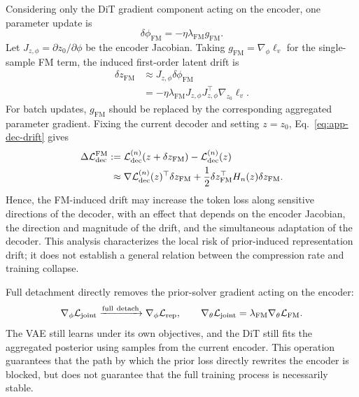 Considering only the DiT gradient component acting on the encoder, one parameter update is
\begin{equation}
    \delta\phi_{\mathrm{FM}}
    =-\eta\lambda_{\mathrm{FM}}g_{\mathrm{FM}}.
    \label{eq:app-fm-phi-drift}
\end{equation}
Let $J_{z,\phi}=\partial z_0/\partial\phi$ be the encoder Jacobian. Taking $g_{\mathrm{FM}}=\nabla_\phi\ell_v$ for the single-sample FM term, the induced first-order latent drift is
\begin{equation}
\begin{aligned}
    \delta z_{\mathrm{FM}}
    &\approx J_{z,\phi}\delta\phi_{\mathrm{FM}}\\
    &=-\eta\lambda_{\mathrm{FM}}
      J_{z,\phi}J_{z,\phi}^{\top}\nabla_{z_0}\ell_v.
\end{aligned}
\label{eq:app-fm-latent-drift}
\end{equation}
For batch updates, $g_{\mathrm{FM}}$ should be replaced by the corresponding aggregated parameter gradient. Fixing the current decoder and setting $z=z_0$, Eq.~\eqref{eq:app-dec-drift} gives
\begin{equation}
\begin{aligned}
    \Delta\mathcal{L}_{\mathrm{dec}}^{\mathrm{FM}}
    :={}&\mathcal{L}_{\mathrm{dec}}^{(n)}(z+\delta z_{\mathrm{FM}})
          -\mathcal{L}_{\mathrm{dec}}^{(n)}(z)\\
    \approx{}&\nabla\mathcal{L}_{\mathrm{dec}}^{(n)}(z)^\top\delta z_{\mathrm{FM}}
      +\frac12\delta z_{\mathrm{FM}}^\top H_n(z)\delta z_{\mathrm{FM}}.
\end{aligned}
\label{eq:app-fm-decoder-drift}
\end{equation}
Hence, the FM-induced drift may increase the token loss along sensitive directions of the decoder, with an effect that depends on the encoder Jacobian, the direction and magnitude of the drift, and the simultaneous adaptation of the decoder. This analysis characterizes the local risk of prior-induced representation drift; it does not establish a general relation between the compression rate and training collapse.

Full detachment directly removes the prior-solver gradient acting on the encoder:
\begin{equation}
    \nabla_\phi\mathcal{L}_{\mathrm{joint}}
    \xrightarrow{\mathrm{full\ detach}}
    \nabla_\phi\mathcal{L}_{\mathrm{rep}},
    \qquad
    \nabla_\theta\mathcal{L}_{\mathrm{joint}}
    =\lambda_{\mathrm{FM}}\nabla_\theta\mathcal{L}_{\mathrm{FM}}.
    \label{eq:app-full-detach}
\end{equation}
The VAE still learns under its own objectives, and the DiT still fits the aggregated posterior using samples from the current encoder. This operation guarantees that the path by which the prior loss directly rewrites the encoder is blocked, but does not guarantee that the full training process is necessarily stable.

